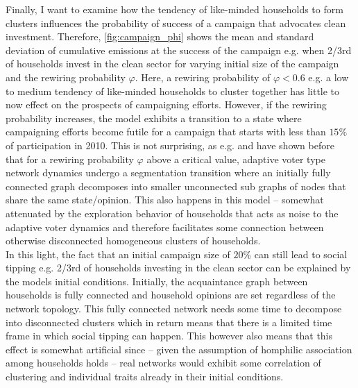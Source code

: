 Finally, I want to examine how the tendency of like-minded households to form clusters influences the probability of success of a campaign that advocates clean investment. Therefore, \cref{fig:campaign_phi} shows the mean and standard deviation of cumulative emissions at the success of the campaign e.g. when 2/3rd of households invest in the clean sector for varying initial size of the campaign and the rewiring probability $\varphi$. Here, a rewiring probability of $\varphi<0.6$ e.g. a low to medium tendency of like-minded households to cluster together has little to now effect on the prospects of campaigning efforts. However, if the rewiring probability increases, the model exhibits a transition to a state where campaigning efforts become futile for a campaign that starts with less than $15\%$ of participation in 2010. This is not surprising, as e.g. \cite{Rogers2013, Wiedermann2015} and \cite{Klamser2016} have shown before that for a rewiring probability $\varphi$ above a critical value, adaptive voter type network dynamics undergo a segmentation transition where an initially fully connected graph decomposes into smaller unconnected sub graphs of nodes that share the same state/opinion. This also happens in this model -- somewhat attenuated by the exploration behavior of households that acts as noise to the adaptive voter dynamics and therefore facilitates some connection between otherwise disconnected homogeneous clusters of households.\\

In this light, the fact that an initial campaign size of $20\%$ can still lead to social tipping e.g. 2/3rd of households investing in the clean sector can be explained by the models initial conditions. Initially, the acquaintance graph between households is fully connected and household opinions are set regardless of the network topology. This fully connected network needs some time to decompose into disconnected clusters which in return means that there is a limited time frame in which social tipping can happen. This however also means that this effect is somewhat artificial since -- given the assumption of homphilic association among households holds -- real networks would exhibit some correlation of clustering and individual traits already in their initial conditions.\\

